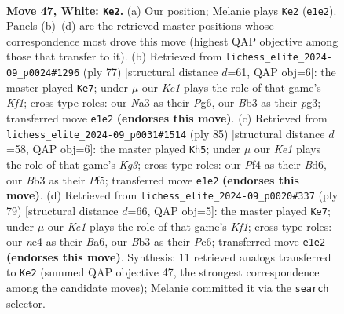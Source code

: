 \documentclass[11pt]{article}
\begin{document}
\clearpage

\begin{figure}[p]\centering
\begin{subfigure}{0.46\textwidth}\centering
\resizebox{\linewidth}{!}{%
\newchessgame
\chessboard[
  setfen={1rb3k1/p2p4/1pp5/5p1p/1PPPnP2/NB6/P6P/2R1K3 w - - 11 47},
  showmover=false,
  pgfstyle=straightmove, color=movearrow, markmove={e1-e2}
]}
\caption{}
\end{subfigure}\hfill
\begin{subfigure}{0.46\textwidth}\centering
\resizebox{\linewidth}{!}{%
\newchessgame
\chessboard[
  setfen={3r1k2/1p5p/p1pn2p1/P4p2/1PP5/4KPP1/7P/2R2B2 b - - 3 39},
  showmover=false,
  pgfstyle=straightmove, color=movearrow, markmove={f8-e7}
]}
\caption{}
\end{subfigure}
\\[4pt]
\begin{subfigure}{0.46\textwidth}\centering
\resizebox{\linewidth}{!}{%
\newchessgame
\chessboard[
  setfen={6r1/2p2p2/3b2k1/3P1p2/pp1B1P2/3K2PP/PP6/7R b - - 1 43},
  showmover=false,
  pgfstyle=straightmove, color=movearrow, markmove={g6-h5}
]}
\caption{}
\end{subfigure}\hfill
\begin{subfigure}{0.46\textwidth}\centering
\resizebox{\linewidth}{!}{%
\newchessgame
\chessboard[
  setfen={r4k2/2p2p2/b1p1p1p1/p1N5/P3PP1p/5P2/1P1K3P/2R5 b - - 0 40},
  showmover=false,
  pgfstyle=straightmove, color=movearrow, markmove={f8-e7}
]}
\caption{}
\end{subfigure}
\caption{\textbf{Move 47, White: \texttt{Ke2}.} (a) Our position; Melanie plays \texttt{Ke2} (\texttt{e1e2}). Panels (b)--(d) are the retrieved master positions whose correspondence most drove this move (highest QAP objective among those that transfer to it). (b) Retrieved from \texttt{lichess\_elite\_2024-09\_p0024\#1296} (ply 77) [structural distance $d$=61, QAP obj=6]: the master played \texttt{Ke7}; under $\mu$ our \emph{Ke1} plays the role of that game's \emph{Kf1}; cross-type roles: our \emph{N}a3 as their \emph{P}g6, our \emph{B}b3 as their \emph{p}g3; transferred move \texttt{e1e2} \textbf{(endorses this move)}. (c) Retrieved from \texttt{lichess\_elite\_2024-09\_p0031\#1514} (ply 85) [structural distance $d$=58, QAP obj=6]: the master played \texttt{Kh5}; under $\mu$ our \emph{Ke1} plays the role of that game's \emph{Kg3}; cross-type roles: our \emph{P}f4 as their \emph{B}d6, our \emph{B}b3 as their \emph{P}f5; transferred move \texttt{e1e2} \textbf{(endorses this move)}. (d) Retrieved from \texttt{lichess\_elite\_2024-09\_p0020\#337} (ply 79) [structural distance $d$=66, QAP obj=5]: the master played \texttt{Ke7}; under $\mu$ our \emph{Ke1} plays the role of that game's \emph{Kf1}; cross-type roles: our \emph{n}e4 as their \emph{B}a6, our \emph{B}b3 as their \emph{P}c6; transferred move \texttt{e1e2} \textbf{(endorses this move)}. Synthesis: 11 retrieved analogs transferred to \texttt{Ke2} (summed QAP objective 47, the strongest correspondence among the candidate moves); Melanie committed it via the \texttt{search} selector.}
\label{fig:thought-m92}
\end{figure}
\end{document}
